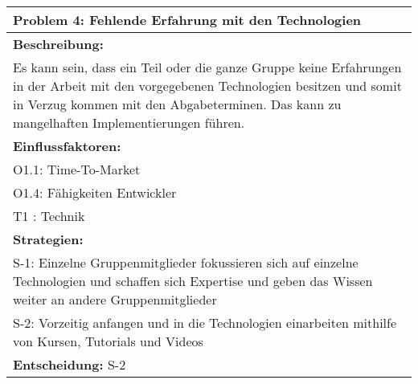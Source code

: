 \documentclass[fontsize=12pt,paper=a4,twoside]{scrartcl}
\begin{document}
\begin{longtable}{|p{15cm}|}
\hline
Problem 4: Fehlende Erfahrung mit den Technologien                                                                           
\\ \hline                                                                                                                                                                                                                                                                                                                                                                                                                                                                                                                                                        
\textbf{Beschreibung:} \\
Es kann sein, dass ein Teil oder die ganze Gruppe keine Erfahrungen in der Arbeit mit den vorgegebenen Technologien besitzen
und somit in Verzug kommen mit den Abgabeterminen. Das kann zu mangelhaften Implementierungen führen. 
\\ \hline
\textbf{Einflussfaktoren:} \\
O1.1: Time-To-Market \\
O1.4: Fähigkeiten Entwickler \\
T1    : Technik
\\ \hline
\textbf{Strategien:} \\
S-1: Einzelne Gruppenmitglieder fokussieren sich auf einzelne Technologien und schaffen sich Expertise und geben das Wissen weiter an andere Gruppenmitglieder\\
S-2: Vorzeitig anfangen und in die Technologien einarbeiten mithilfe von Kursen, Tutorials und Videos
 \\ \hline
 \textbf{Entscheidung:} S-2
\\ \hline
\end{longtable}
\end{document}
